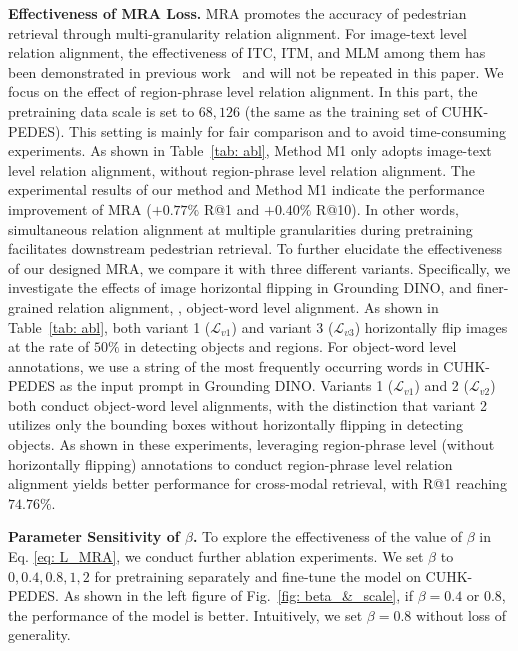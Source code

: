 \noindent\textbf{Effectiveness of MRA Loss.} 
MRA promotes the accuracy of pedestrian retrieval through multi-granularity relation alignment. 
For image-text level relation alignment, the effectiveness of ITC, ITM, and MLM among them has been demonstrated in previous work~\cite{jiang2023cross, bai2023rasa, yang2023towards} and will not be repeated in this paper. 
We focus on the effect of region-phrase level relation alignment.
In this part, the pretraining data scale is set to $68,126$ (the same as the training set of CUHK-PEDES). This setting is mainly for fair comparison and to avoid time-consuming experiments.
As shown in Table~\ref{tab: abl}, Method M1 only adopts image-text level relation alignment, without region-phrase level relation alignment.
The experimental results of our method and Method M1 indicate the performance improvement of MRA ($+0.77 \%$ R@1 and $+0.40 \%$ R@10). 
In other words, simultaneous relation alignment at multiple granularities during pretraining facilitates downstream pedestrian retrieval.
To further elucidate the effectiveness of our designed MRA, we compare it with three different variants. 
Specifically, we investigate the effects of image horizontal flipping in Grounding DINO, and finer-grained relation alignment, \ie, object-word level alignment. 
As shown in Table~\ref{tab: abl}, both variant 1 ($\mathcal{L}_{v1}$) and variant 3 ($\mathcal{L}_{v3}$) horizontally flip images at the rate of $50 \%$ in detecting objects and regions. 
For object-word level annotations, we use a string of the most frequently occurring words in CUHK-PEDES as the input prompt in Grounding DINO.
Variants 1 ($\mathcal{L}_{v1}$) and 2 ($\mathcal{L}_{v2}$) both conduct object-word level alignments, with the distinction that variant 2 utilizes only the bounding boxes without horizontally flipping in detecting objects. 
As shown in these experiments, leveraging region-phrase level (without horizontally flipping) annotations to conduct region-phrase level relation alignment yields better performance for cross-modal retrieval, with R@1 reaching $74.76\%$.

\noindent\textbf{Parameter Sensitivity of $\beta$.} 
To explore the effectiveness of the value of $\beta$ in Eq. \ref{eq: L_MRA}, we conduct further ablation experiments. 
We set $\beta$ to $0, 0.4, 0.8,  1, 2$ for pretraining separately and fine-tune the model on CUHK-PEDES. 
As shown in the left figure of Fig.~\ref{fig: beta_&_scale}, if $\beta = 0.4$ or $0.8$, the performance of the model is better. Intuitively, we set $\beta = 0.8$ without loss of generality.





